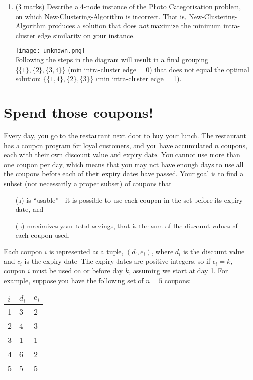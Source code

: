 \documentclass[11pt]{article}
\begin{document}
\begin{enumerate}
  
\item
  (3 marks)
Describe a 4-node instance of the Photo Categorization problem, on which New-Clustering-Algorithm is incorrect. That is, New-Clustering-Algorithm produces a solution that does {\em not} maximize the minimum intra-cluster edge similarity on your instance.


\begin{soln}

\texttt{[image: unknown.png]}\\
Following the steps in the diagram will result in a final grouping $\{\{1 \}, \{ 2\},\{3,4 \}\}$ (min intra-cluster edge = 0)  that does not equal the optimal solution: $\{\{1,4 \}, \{ 2\},\{3 \}\}$ (min intra-cluster edge = 1).
\end{soln}

  \end{enumerate}
\newpage
\section{Spend those coupons!}
Every day, you go to the restaurant next door to buy your lunch. The restaurant has a coupon program for loyal customers, and you have accumulated $n$ coupons, each with their own discount value and expiry date. You cannot use more than one coupon per day, which means that you may not have enough days to use all the coupons before each of their expiry dates have passed. Your goal is to find a subset (not necessarily a proper subset) of coupons that
\begin{enumerate}
    \item[(a)] is “usable” - it is possible to use each coupon in the set before its expiry date, and 
    \item[(b)] maximizes your total savings, that is the sum of the discount values of each coupon used. 
\end{enumerate}

Each coupon $i$ is represented as a tuple, $(d_i, e_i)$, where $d_i$ is the discount value and $e_i$ is the expiry date. The expiry dates are positive integers, so if $e_i=k$, coupon $i$ must be used on or before day $k$, assuming we start at day 1. For example, suppose you have the following set of $n = 5$ coupons:
\begin{table}[h]
    \centering
    \begin{tabular}{l|ll} 
    $i$ & $d_i$ & $e_i$ \\ \hline
    1 & 3 & 2   \\
    2 & 4 & 3   \\
    3 & 1 & 1   \\
    4 & 6 & 2   \\
    5 & 5 & 5   \\
    \end{tabular}
\end{table}
\end{document}
